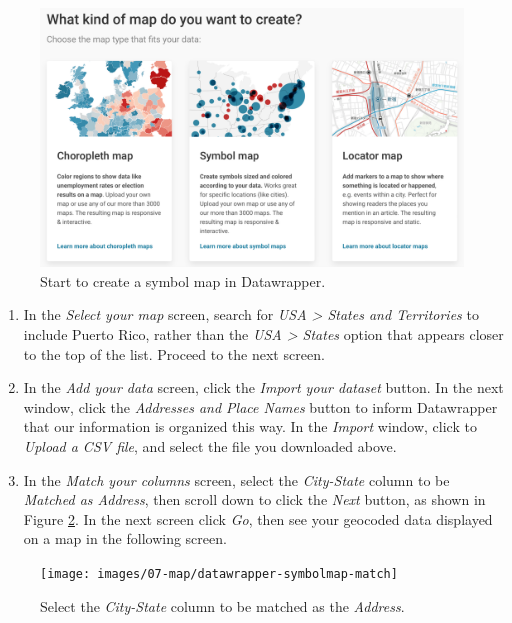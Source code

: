 \documentclass[
  english,
]{book}
\begin{document}
\begin{figure}
\includegraphics[width=600px]{images/07-map/datawrapper-symbolmap-start} \caption{Start to create a symbol map in Datawrapper.}\label{fig:datawrapper-symbolmap-start}
\end{figure}

\begin{enumerate}
\def\labelenumi{\arabic{enumi}.}
\setcounter{enumi}{3}
\item
  In the \emph{Select your map} screen, search for \emph{USA \textgreater{} States and Territories} to include Puerto Rico, rather than the \emph{USA \textgreater{} States} option that appears closer to the top of the list. Proceed to the next screen.
\item
  In the \emph{Add your data} screen, click the \emph{Import your dataset} button. In the next window, click the \emph{Addresses and Place Names} button to inform Datawrapper that our information is organized this way. In the \emph{Import} window, click to \emph{Upload a CSV file}, and select the file you downloaded above.
\item
  In the \emph{Match your columns} screen, select the \emph{City-State} column to be \emph{Matched as Address}, then scroll down to click the \emph{Next} button, as shown in Figure \ref{fig:datawrapper-symbolmap-match}. In the next screen click \emph{Go}, then see your geocoded data displayed on a map in the following screen.
\end{enumerate}



\begin{figure}
\texttt{[image: images/07-map/datawrapper-symbolmap-match]} \caption{Select the \emph{City-State} column to be matched as the \emph{Address}.}\label{fig:datawrapper-symbolmap-match}
\end{figure}
\end{document}
